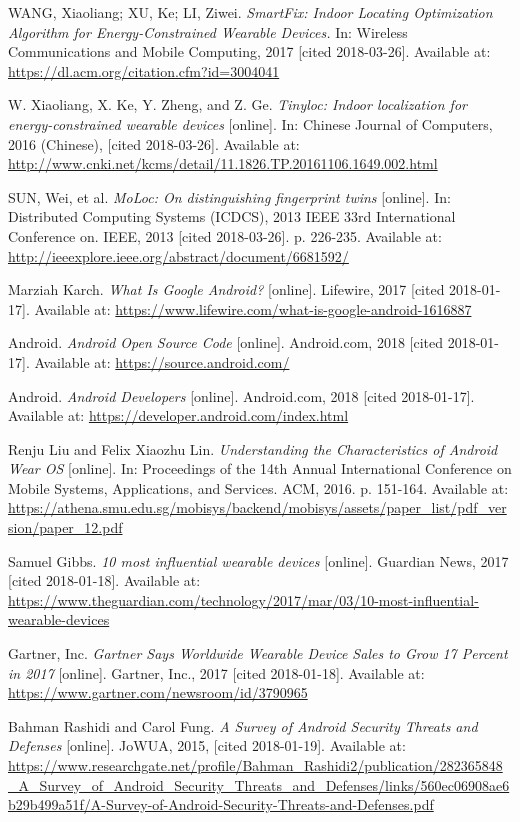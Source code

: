 \begin{thebibliography}{10}
WANG, Xiaoliang; XU, Ke; LI, Ziwei. \textit{SmartFix: Indoor Locating Optimization Algorithm for Energy-Constrained Wearable Devices.} In: Wireless Communications and Mobile Computing, 2017 [cited 2018-03-26]. Available at: \url{https://dl.acm.org/citation.cfm?id=3004041}

W. Xiaoliang, X. Ke, Y. Zheng, and Z. Ge. \textit{Tinyloc: Indoor localization for energy-constrained wearable devices} [online]. In: Chinese Journal of Computers, 2016 (Chinese), [cited 2018-03-26]. Available at: \url{http://www.cnki.net/kcms/detail/11.1826.TP.20161106.1649.002.html}

SUN, Wei, et al. \textit{MoLoc: On distinguishing fingerprint twins} [online]. In: Distributed Computing Systems (ICDCS), 2013 IEEE 33rd International Conference on. IEEE, 2013 [cited 2018-03-26]. p. 226-235. Available at: \url{http://ieeexplore.ieee.org/abstract/document/6681592/}

Marziah Karch. \textit{What Is Google Android?} [online]. Lifewire, 2017 [cited 2018-01-17]. Available at: \url{https://www.lifewire.com/what-is-google-android-1616887}

Android. \textit{Android Open Source Code} [online]. Android.com, 2018 [cited 2018-01-17]. Available at: \url{https://source.android.com/}

Android. \textit{Android Developers} [online]. Android.com, 2018 [cited 2018-01-17]. Available at: \url{https://developer.android.com/index.html}

Renju Liu and Felix Xiaozhu Lin. \textit{Understanding the Characteristics of Android Wear OS} [online]. In: Proceedings of the 14th Annual International Conference on Mobile Systems, Applications, and Services. ACM, 2016. p. 151-164. Available at: \url{https://athena.smu.edu.sg/mobisys/backend/mobisys/assets/paper_list/pdf_version/paper_12.pdf}

Samuel Gibbs. \textit{10 most influential wearable devices} [online]. Guardian News, 2017 [cited 2018-01-18]. Available at: \url{https://www.theguardian.com/technology/2017/mar/03/10-most-influential-wearable-devices}

Gartner, Inc. \textit{Gartner Says Worldwide Wearable Device Sales to Grow 17 Percent in 2017} [online]. Gartner, Inc., 2017 [cited 2018-01-18]. Available at: \url{https://www.gartner.com/newsroom/id/3790965}

Bahman Rashidi and Carol Fung. \textit{A Survey of Android Security Threats and Defenses} [online]. JoWUA, 2015, [cited 2018-01-19]. Available at: \url{https://www.researchgate.net/profile/Bahman_Rashidi2/publication/282365848_A_Survey_of_Android_Security_Threats_and_Defenses/links/560ec06908ae6b29b499a51f/A-Survey-of-Android-Security-Threats-and-Defenses.pdf}


\end{thebibliography}
